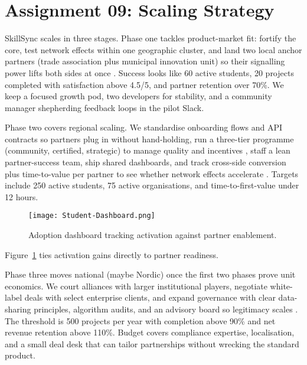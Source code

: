 \section*{Assignment 09: Scaling Strategy}

SkillSync scales in three stages. Phase one tackles product-market fit: fortify the core, test network effects within one geographic cluster, and land two local anchor partners (trade association plus municipal innovation unit) so their signalling power lifts both sides at once \citep{Choudary2016,Reillier2017}. Success looks like 60 active students, 20 projects completed with satisfaction above 4.5/5, and partner retention over 70\%. We keep a focused growth pod, two developers for stability, and a community manager shepherding feedback loops in the pilot Slack.

Phase two covers regional scaling. We standardise onboarding flows and API contracts so partners plug in without hand-holding, run a three-tier programme (community, certified, strategic) to manage quality and incentives \citep{HagiuWright2013}, staff a lean partner-success team, ship shared dashboards, and track cross-side conversion plus time-to-value per partner to see whether network effects accelerate \citep{ShapiroVarian1999,Lecture12}. Targets include 250 active students, 75 active organisations, and time-to-first-value under 12 hours.

\begin{figure}[H]
  \centering
  \texttt{[image: Student-Dashboard.png]}
  \caption{Adoption dashboard tracking activation against partner enablement.}
  \label{fig:scaling-dashboard}
\end{figure}

Figure~\ref{fig:scaling-dashboard} ties activation gains directly to partner readiness.

Phase three moves national (maybe Nordic) once the first two phases prove unit economics. We court alliances with larger institutional players, negotiate white-label deals with select enterprise clients, and expand governance with clear data-sharing principles, algorithm audits, and an advisory board so legitimacy scales \citep{Srnicek2017,Zuboff2019}. The threshold is 500 projects per year with completion above 90\% and net revenue retention above 110\%. Budget covers compliance expertise, localisation, and a small deal desk that can tailor partnerships without wrecking the standard product.

